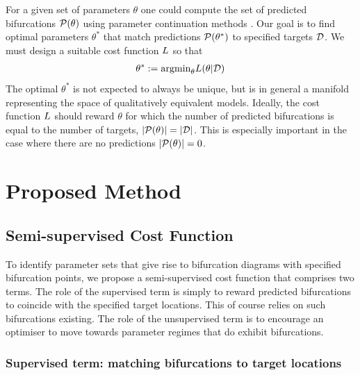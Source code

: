 \documentclass{article}
\begin{document}
For a given set of parameters $\theta$ one could compute the set of predicted bifurcations $\mathcal{P}(\theta)$ using parameter continuation methods \cite{Veltz2020BifurcationKit.jl,Farrell2016TheDiagrams}. Our goal is to find optimal parameters $\theta^*$ that match predictions $\mathcal{P}(\theta^*)$ to specified targets $\mathcal{D}$. We must design a suitable cost function $L$ so that
\begin{align}
    \theta^* := \mathrm{argmin}_{\theta} L(\theta|\mathcal{D})
    \label{eq:optimal-theta}
\end{align}
The optimal $\theta^*$ is not expected to always be unique, but is in general a manifold representing the space of qualitatively equivalent models. Ideally, the cost function $L$ should reward $\theta$ for which the number of predicted bifurcations is equal to the number of targets, $|\mathcal{P}(\theta)|=|\mathcal{D}|$. This is especially important in the case where there are no predictions $|\mathcal{P}(\theta)|=0$.

\section{Proposed Method}
\label{section:method}
\subsection{Semi-supervised Cost Function}

To identify parameter sets that give rise to bifurcation diagrams with specified bifurcation points, we propose a semi-supervised cost function that comprises two terms. The role of the supervised term is simply to reward predicted bifurcations to coincide with the specified target locations. This of course relies on such bifurcations existing. The role of the unsupervised term is to encourage an optimiser to move towards parameter regimes that do exhibit bifurcations.

\subsubsection{Supervised term: matching bifurcations to target locations}
\end{document}
